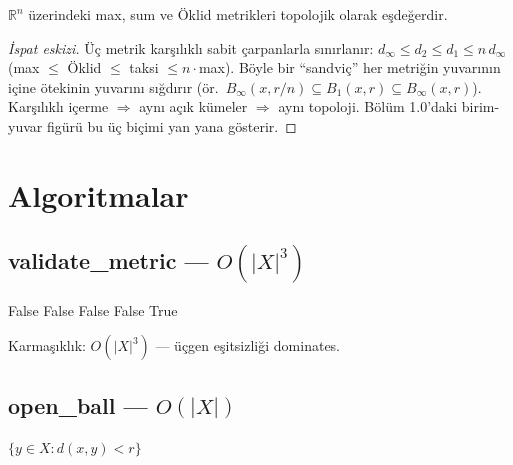 \begin{theorem}
$\mathbb{R}^n$ üzerindeki max, sum ve Öklid metrikleri topolojik olarak eşdeğerdir.
\end{theorem}

\begin{proof}[İspat eskizi]
Üç metrik karşılıklı sabit çarpanlarla sınırlanır:
$d_\infty \leq d_2 \leq d_1 \leq n\,d_\infty$ (max $\leq$ Öklid $\leq$ taksi
$\leq n\cdot$max). Böyle bir ``sandviç'' her metriğin yuvarının içine ötekinin
yuvarını sığdırır (ör.\ $B_\infty(x, r/n) \subseteq B_1(x, r) \subseteq B_\infty(x, r)$).
Karşılıklı içerme $\Rightarrow$ aynı açık kümeler $\Rightarrow$ aynı topoloji.
Bölüm 1.0'daki birim-yuvar figürü bu üç biçimi yan yana gösterir.
\end{proof}

\section{Algoritmalar}

\subsection{validate\_metric — $O(|X|^3)$}

\begin{algorithm}
\caption{ValidateMetric$(X, d)$}
\begin{algorithmic}[1]
     \Return False \EndIf
         \Return False \EndIf
    \EndFor
\EndFor
{}
     \Return False \EndIf
\EndFor
{}
     \Return False \EndIf
\EndFor
\State \Return True
\end{algorithmic}
\end{algorithm}

Karmaşıklık: $O(|X|^3)$ — üçgen eşitsizliği dominates.

\subsection{open\_ball — $O(|X|)$}

\begin{algorithm}
\caption{OpenBall$(x, r, X, d)$}
\begin{algorithmic}[1]
\State \Return $\{y \in X : d(x,y) < r\}$
\end{algorithmic}
\end{algorithm}

